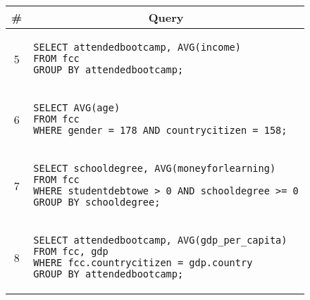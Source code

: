 \begin{tabular}{cl}
\toprule
\# & \multicolumn{1}{c}{Query} \\
\midrule
5 & 
\begin{minipage}{6in}
\begin{lstlisting}[breaklines]
SELECT attendedbootcamp, AVG(income)
FROM fcc
GROUP BY attendedbootcamp;
\end{lstlisting}
\end{minipage}{queryno} \label[query]{q5} \\
6 & 
\begin{minipage}{6in}
\begin{lstlisting}[breaklines]
SELECT AVG(age)
FROM fcc
WHERE gender = 178 AND countrycitizen = 158;
\end{lstlisting}
\end{minipage}{queryno} \label[query]{q6} \\
7 & 
\begin{minipage}{6in}
\begin{lstlisting}[breaklines]
SELECT schooldegree, AVG(moneyforlearning)
FROM fcc
WHERE studentdebtowe > 0 AND schooldegree >= 0
GROUP BY schooldegree;
\end{lstlisting}
\end{minipage}{queryno} \label[query]{q7}\\
8 & 
\begin{minipage}{6in}
\begin{lstlisting}[breaklines]
SELECT attendedbootcamp, AVG(gdp_per_capita)
FROM fcc, gdp
WHERE fcc.countrycitizen = gdp.country
GROUP BY attendedbootcamp;
\end{lstlisting}
\end{minipage}{queryno} \label[query]{q8}\\
\bottomrule
\end{tabular}
